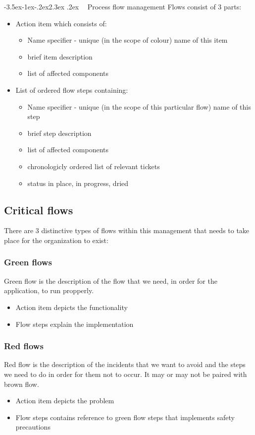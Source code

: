 \documentclass[12pt,a4paper,twoside]{article}
\makeatletter
\def\section{\@startsection{section}{1}{\z@ }%
  {-3.5ex\@plus -1ex\@minus -.2ex}{2.3ex \@plus .2ex}%
  {\noindent\normalfont \Large \bfseries \ }%
}
\makeatother
\begin{document}
\section{Process flow management}
Flows consist of 3 parts:
\begin{itemize}
  \item Action item which consists of:
  \begin{itemize}
    \item Name specifier - unique (in the scope of colour) name of this item
    \item brief item description
    \item list of affected components
  \end{itemize}
  \item List of ordered flow steps containing:
  \begin{itemize}
    \item Name specifier - unique (in the scope of this particular flow) name of this step
    \item brief step description
    \item list of affected components
    \item chronologicly ordered list of relevant tickets
    \item status {in place, in progress, dried}
  \end{itemize}
\end{itemize}
\subsection{Critical flows}
There are 3 distinctive types of flows within this management that needs to take place for the organization to exist:
\subsubsection{Green flows}\label{philo:green:flow}
Green flow is the description of the flow that we need, in order for the application, to run propperly. 
\begin{itemize}
  \item Action item depicts the functionality 
  \item Flow steps explain the implementation
\end{itemize}
\subsubsection{Red flows}\label{philo:red:flow}
Red flow is the description of the incidents that we want to avoid and the steps we need to do in order for them not to occur. It may or may not be paired with brown flow.
\begin{itemize}
  \item Action item depicts the problem 
  \item Flow steps contains reference to green flow steps that implements safety precautions
\end{itemize}
\end{document}
